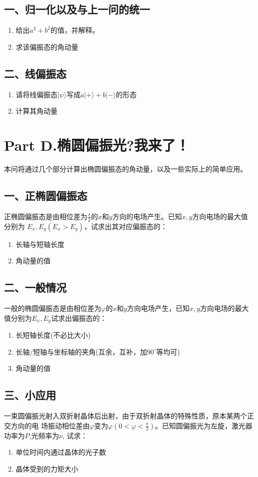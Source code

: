 \documentclass[utf8]{ctexart}
\begin{document}
\subsection*{一、归一化以及与上一问的统一}
\begin{enumerate}
\def\labelenumi{(\arabic{enumi})}
\item 
  给出$a^2+b^2$的值，并解释。
\item 
  求该偏振态的角动量
\end{enumerate}
\subsection*{二、线偏振态}
\begin{enumerate}
  \def\labelenumi{(\arabic{enumi})}
\item 
  请将线偏振态$|\psi\rangle $写成$a|+\rangle + b |-\rangle$的形态
\item 
  计算其角动量
\end{enumerate}
\section*{Part D.椭圆偏振光?我来了！}
本问将通过几个部分计算出椭圆偏振态的角动量，以及一些实际上的简单应用。
\subsection*{一、正椭圆偏振态}
正椭圆偏振态是由相位差为$\frac{\pi}{2} $的$x$和$y$方向的电场产生。已知$x,y$方向电场的最大值分别为 $E_x,E_y(E_x>E_y)$，试求出其对应偏振态的：
\begin{enumerate}
  \def\labelenumi{(\arabic{enumi})}
\item 
  长轴与短轴长度
\item 
  角动量的值
\end{enumerate}
\subsection*{二、一般情况}
一般的椭圆偏振态是由相位差为$\varphi$的$x$和$y$方向电场产生，已知$x,y$方向电场的最大值分别为$E_x,E_y$试求出偏振态的：
\begin{enumerate}
  \def\labelenumi{(\arabic{enumi})}
\item 
长短轴长度(不必比大小)
\item 
长轴/短轴与坐标轴的夹角(互余，互补，加$90^\circ $等均可)
\item 
角动量的值
\end{enumerate}
\subsection*{三、小应用}
一束圆偏振光射入双折射晶体后出射，由于双折射晶体的特殊性质，原本某两个正交方向的电 场振动相位差由$\varphi $变为$\varphi(0 < \varphi<\frac{\pi}{2})$。已知圆偏振光为左旋，激光器功率为$P$,光频率为$\nu$, 试求：
\begin{enumerate}
  \def\labelenumi{(\arabic{enumi})}
\item 
单位时间内通过晶体的光子数 
\item 
晶体受到的力矩大小
\end{enumerate}
\end{document}
